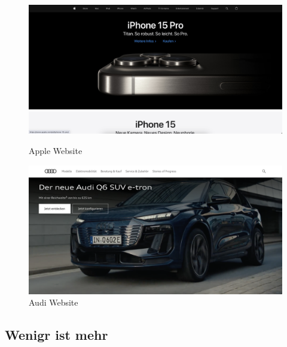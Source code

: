 \begin{figure}
   \begin{minipage}[b]{.4\linewidth} 
      \includegraphics[width=\linewidth]{pics/apple.png}
      \caption{Apple Website}
      \label{fig:impl:weniger:apple}
   \end{minipage}
   \hspace{.05\linewidth}
   \begin{minipage}[b]{.4\linewidth}
      \includegraphics[width=\linewidth]{pics/audi.png}
      \caption{Audi Website}
      \label{fig:impl:weniger:audi}
   \end{minipage}
\end{figure}

\subsection{Wenigr ist mehr}

